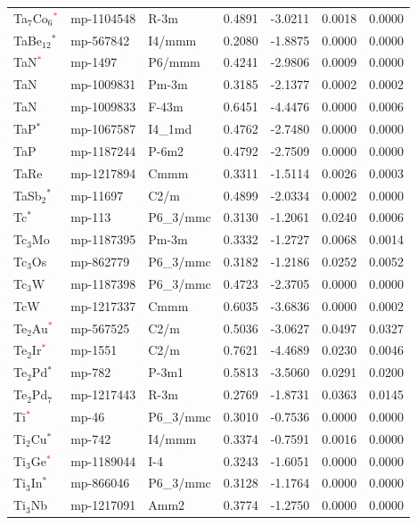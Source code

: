 \begin{longtable}{@{}lllrrrr@{}}
Ta$_{7}$Co$_{6}$\textcolor{red}{$^*$} & mp-1104548 & R-3m & 0.4891 & -3.0211 & 0.0018 & 0.0000 \\
TaBe$_{12}$$^*$ & mp-567842 & I4/mmm & 0.2080 & -1.8875 & 0.0000 & 0.0000 \\
TaN\textcolor{red}{$^*$} & mp-1497 & P6/mmm & 0.4241 & -2.9806 & 0.0009 & 0.0000 \\
TaN & mp-1009831 & Pm-3m & 0.3185 & -2.1377 & 0.0002 & 0.0002 \\
TaN & mp-1009833 & F-43m & 0.6451 & -4.4476 & 0.0000 & 0.0006 \\
TaP$^*$ & mp-1067587 & I4\_1md & 0.4762 & -2.7480 & 0.0000 & 0.0000 \\
TaP & mp-1187244 & P-6m2 & 0.4792 & -2.7509 & 0.0000 & 0.0000 \\
TaRe & mp-1217894 & Cmmm & 0.3311 & -1.5114 & 0.0026 & 0.0003 \\
TaSb$_{2}$$^*$ & mp-11697 & C2/m & 0.4899 & -2.0334 & 0.0002 & 0.0000 \\
Tc$^*$ & mp-113 & P6\_3/mmc & 0.3130 & -1.2061 & 0.0240 & 0.0006 \\
Tc$_{3}$Mo & mp-1187395 & Pm-3m & 0.3332 & -1.2727 & 0.0068 & 0.0014 \\
Tc$_{3}$Os & mp-862779 & P6\_3/mmc & 0.3182 & -1.2186 & 0.0252 & 0.0052 \\
Tc$_{3}$W & mp-1187398 & P6\_3/mmc & 0.4723 & -2.3705 & 0.0000 & 0.0000 \\
TcW & mp-1217337 & Cmmm & 0.6035 & -3.6836 & 0.0000 & 0.0002 \\
Te$_{2}$Au\textcolor{red}{$^*$} & mp-567525 & C2/m & 0.5036 & -3.0627 & 0.0497 & 0.0327 \\
Te$_{2}$Ir\textcolor{red}{$^*$} & mp-1551 & C2/m & 0.7621 & -4.4689 & 0.0230 & 0.0046 \\
Te$_{2}$Pd$^*$ & mp-782 & P-3m1 & 0.5813 & -3.5060 & 0.0291 & 0.0200 \\
Te$_{2}$Pd$_{7}$ & mp-1217443 & R-3m & 0.2769 & -1.8731 & 0.0363 & 0.0145 \\
Ti\textcolor{red}{$^*$} & mp-46 & P6\_3/mmc & 0.3010 & -0.7536 & 0.0000 & 0.0000 \\
Ti$_{2}$Cu$^*$ & mp-742 & I4/mmm & 0.3374 & -0.7591 & 0.0016 & 0.0000 \\
Ti$_{3}$Ge\textcolor{red}{$^*$} & mp-1189044 & I-4 & 0.3243 & -1.6051 & 0.0000 & 0.0000 \\
Ti$_{3}$In$^*$ & mp-866046 & P6\_3/mmc & 0.3128 & -1.1764 & 0.0000 & 0.0000 \\
Ti$_{3}$Nb & mp-1217091 & Amm2 & 0.3774 & -1.2750 & 0.0000 & 0.0000 \\

\end{longtable}
